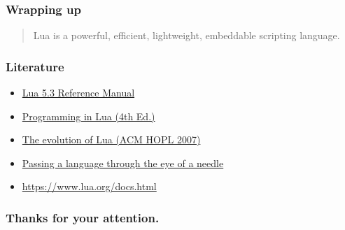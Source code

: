 \documentclass{beamer}
\begin{document}

\begin{frame}
  \frametitle{Wrapping up}

  \begin{quote}Lua is a powerful, efficient, lightweight, embeddable scripting language.\end{quote}
\end{frame}

\begin{frame}
  \frametitle{Literature}

  \begin{itemize}
  \item \href{https://www.lua.org/manual/5.3/}{Lua 5.3 Reference Manual}
  \item \href{https://www.lua.org/pil/}{Programming in Lua (4th Ed.)}
  \item \href{https://www.lua.org/doc/hopl.pdf}{The evolution of Lua (ACM HOPL 2007)}
  \item \href{https://dl.acm.org/citation.cfm?id=1983083}{Passing a language through the eye of a needle}
  \item \href{https://www.lua.org/docs.html}{https://www.lua.org/docs.html}
  \end{itemize}
\end{frame}

\begin{frame}
  \frametitle{Thanks for your attention.}
\end{frame}
\end{document}
